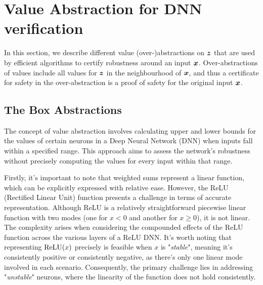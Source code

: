 \section{Value Abstraction for DNN verification}

In this section, we describe different value (over-)abstractions on ${\bm{z}}$ that are used by efficient algorithms to certify robustness around an input ${\bm{x}}$. Over-abstractions of values include all values for ${\bm{z}}$ in the neighbourhood of ${\bm{x}}$, and thus a certificate for safety in the over-abstraction is a proof of safety for the original input ${\bm{x}}$.

\subsection{The Box Abstractions}





The concept of value abstraction involves calculating upper and lower bounds for the values of certain neurons in a Deep Neural Network (DNN) when inputs fall within a specified range. This approach aims to assess the network's robustness without precisely computing the values for every input within that range.

Firstly, it's important to note that weighted sums represent a linear function, which can be explicitly expressed with relative ease. However, the ReLU (Rectified Linear Unit) function presents a challenge in terms of accurate representation. Although ReLU is a relatively straightforward piecewise linear function with two modes (one for $x<0$ and another for $x \geq 0$), it is not linear. The complexity arises when considering the compounded effects of the ReLU function across the various layers of a ReLU DNN. It's worth noting that representing $\mathrm{ReLU}(x)$ precisely is feasible when $x$ is "{\em stable}", meaning it's consistently positive or consistently negative, as there's only one linear mode involved in each scenario. Consequently, the primary challenge lies in addressing "{\em unstable}" neurons, where the linearity of the function does not hold consistently.



